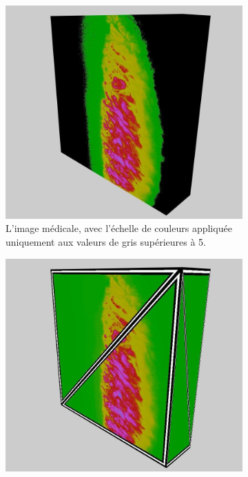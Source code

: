 {{{            \begin{figure}[h]
                \centering
                \begin{subfigure}{.45\linewidth}
                    \centering
                    \includegraphics[width=.9\linewidth]{img/visu_screens/thresholds.jpg}
                    \captionsetup{width=.9\linewidth}
                    \caption{L'image médicale, avec l'échelle de couleurs appliquée uniquement aux valeurs de gris supérieures à 5.}
                    \label{img:visualisateur:functions:thresholds}
                \end{subfigure}
                \begin{subfigure}{.45\linewidth}
                    \centering
                    \includegraphics[width=.9\linewidth]{img/visu_screens/wireframe.jpg}

\end{subfigure}
\end{figure}}}}
